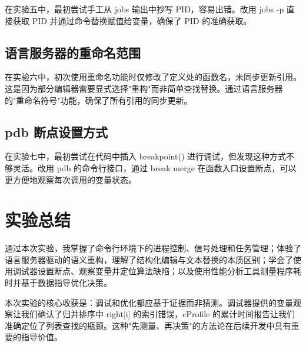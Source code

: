 \documentclass[UTF8]{ctexart}
\begin{document}
在实验五中，最初尝试手工从 jobs 输出中抄写 PID，容易出错。改用 jobs -p 直接获取 PID 并通过命令替换赋值给变量，确保了 PID 的准确获取。

\subsection{语言服务器的重命名范围}

在实验六中，初次使用重命名功能时仅修改了定义处的函数名，未同步更新引用。这是因为部分编辑器需要显式选择"重构"而非简单查找替换。通过语言服务器的"重命名符号"功能，确保了所有引用的同步更新。

\subsection{pdb 断点设置方式}

在实验七中，最初尝试在代码中插入 breakpoint() 进行调试，但发现这种方式不够灵活。改用 pdb 的命令行接口，通过 break merge 在函数入口设置断点，可以更方便地观察每次调用的变量状态。

\section{实验总结}

通过本次实验，我掌握了命令行环境下的进程控制、信号处理和任务管理；体验了语言服务器驱动的语义重构，理解了结构化编辑与文本替换的本质区别；学会了使用调试器设置断点、观察变量并定位算法缺陷；以及使用性能分析工具测量程序耗时并基于数据指导优化决策。

本次实验的核心收获是：调试和优化都应基于证据而非猜测。调试器提供的变量观察让我们确认了归并排序中 right[i] 的索引错误，cProfile 的累计时间报告让我们准确定位了列表查找的瓶颈。这种"先测量、再决策"的方法论在后续开发中具有重要的指导价值。
\end{document}
